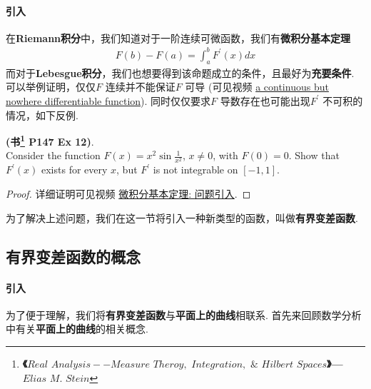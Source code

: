 \paragraph{引入}
	在\textbf{Riemann积分}中，我们知道对于一阶连续可微函数，我们有\textbf{微积分基本定理}
	\begin{align}
		F(b) - F(a) = \int_{a}^{b}{F^{'}(x) dx}
	\end{align}
	而对于\textbf{Lebesgue积分}，我们也想要得到该命题成立的条件，且最好为\textbf{充要条件}. 可以举例证明，仅仅$F$ 连续并不能保证$F$ 可导 (可见视频 \href{https://www.bilibili.com/video/BV1GV411e7dP?p=31}{a continuous but nowhere differentiable function}). 同时仅仅要求$F$ 导数存在也可能出现$F^{'}$ 不可积的情况，如下反例.
	\begin{example}\label{ex 4.4.1}
		\textbf{(书\footnote{\textbf{《$Real \,\, Analysis -- Measure \,\, Theroy, \,\, Integration, \,\, \& \,\, Hilbert \,\, Spaces$》--- $Elias \,\, M. \,\, Stein$}} P147 Ex 12)}. \\
		Consider the function $F(x) = x^{2} \sin{\frac{1}{x^2}}$, $x \neq 0$, with $F(0) = 0$. Show that $F^{'}(x)$ exists for every $x$, but $F^{'}$ is not integrable on $[-1 , 1]$.
		
		\vspace{2em}
		\begin{proof}
			详细证明可见视频 \href{https://www.bilibili.com/video/BV1FT411C7wM?p=34}{微积分基本定理: 问题引入}.
		\end{proof}
	\end{example}

	\vspace{2em}
	\begin{center}
		为了解决上述问题，我们在这一节将引入一种新类型的函数，叫做\textbf{有界变差函数}.
	\end{center}

\newpage
\subsection{有界变差函数的概念}
\paragraph{引入}
	为了便于理解，我们将\textbf{有界变差函数}与\textbf{平面上的曲线}相联系. 首先来回顾数学分析中有关\textbf{平面上的曲线}的相关概念.
	
